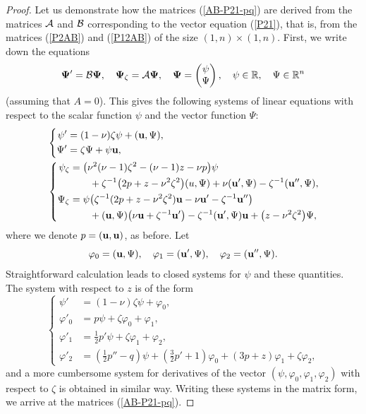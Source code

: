 \documentclass[11pt]{article}
\theoremstyle{plain}
\theoremstyle{definition}
\begin{document}
\begin{proof}
Let us demonstrate how the matrices (\ref{AB-P21-pq}) are derived from the matrices ${\cal A}$ and ${\cal B}$ corresponding to the vector equation (\ref{P21}), that is, from the matrices (\ref{P2AB}) and (\ref{P12AB}) of the size $(1,n)\times(1,n)$. First, we write down the equations
\[
 {\bf\Psi}'={\cal B}{\bf\Psi},\quad
 {\bf\Psi}_\zeta={\cal A}{\bf\Psi},\quad 
 {\bf\Psi}=\begin{pmatrix} \psi \\ \Psi \end{pmatrix},\quad \psi\in\mathbb{R},\quad \Psi\in\mathbb{R}^n
\]
(assuming that $A=0$). This gives the following systems of linear equations with respect to the scalar function $\psi$ and the vector function $\Psi$:
\begin{align*}
 &\left\{\begin{aligned}
  \psi'&= (1-\nu)\zeta\psi+({\bf u},\Psi),\\
  \Psi'&= \zeta\Psi+\psi {\bf u},
  \end{aligned}\right.\\
 &\left\{\begin{aligned} 
  \psi_\zeta&= \bigl(\nu^2(\nu-1)\zeta^2-(\nu-1)z-\nu p\bigr)\psi\\
    &\qquad +\zeta^{-1}\bigl(2p+z-\nu^2\zeta^2\bigr)(u,\Psi)+\nu({\bf u}',\Psi)-\zeta^{-1}({\bf u}'',\Psi),\\ 
  \Psi_\zeta&= \psi\bigl(\zeta^{-1}(2p+z-\nu^2\zeta^2){\bf u}-\nu {\bf u}'-\zeta^{-1}{\bf u}''\bigr)\\
    &\qquad +({\bf u},\Psi)\bigl(\nu {\bf u}+\zeta^{-1}{\bf u}'\bigr)
      -\zeta^{-1}({\bf u}',\Psi){\bf u} +\bigl(z-\nu^2\zeta^2\bigr)\Psi,
  \end{aligned}\right.
\end{align*}
where we denote $p=({\bf u},{\bf u})$, as before. Let
\[
 \varphi_0=({\bf u},\Psi),\quad \varphi_1=({\bf u}',\Psi),\quad \varphi_2=({\bf u}'',\Psi).
\]
Straightforward calculation leads to closed systems for $\psi$ and these quantities. The system with respect to $z$ is of the form
\[
 \left\{\begin{aligned}
  \psi'&= (1-\nu)\zeta\psi+\varphi_0,\\
  \varphi'_0&= p\psi+\zeta\varphi_0+\varphi_1,\\
  \varphi'_1&= \tfrac{1}{2}p'\psi+\zeta\varphi_1+\varphi_2,\\
  \varphi'_2&= (\tfrac{1}{2}p''-q)\psi+(\tfrac{3}{2}p'+1)\varphi_0+(3p+z)\varphi_1+\zeta\varphi_2,
 \end{aligned}\right.
\]
and a more cumbersome system for derivatives of the vector $(\psi,\varphi_0,\varphi_1,\varphi_2)$ with respect to $\zeta$ is obtained in similar way. Writing these systems in the matrix form, we arrive at the matrices (\ref{AB-P21-pq}).


\end{proof}
\end{document}
